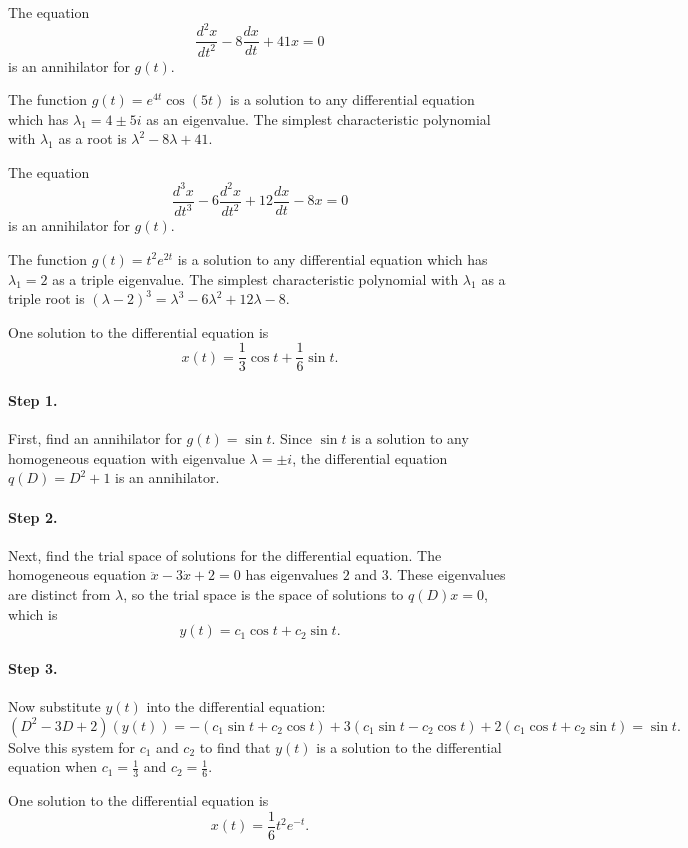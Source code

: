 \documentclass{ximera}
\begin{document}
 \ans The equation
\[
\frac{d^2x}{dt^2} - 8\frac{dx}{dt} + 41x = 0
\]
is an annihilator for $g(t)$.

\soln The function $g(t) = e^{4t}\cos(5t)$ is a solution to any differential
equation which has $\lambda_1 = 4 \pm 5i$ as an eigenvalue.  The
simplest characteristic polynomial with $\lambda_1$ as a root is
$\lambda^2 - 8\lambda + 41$.

 \ans The equation
\[
\frac{d^3x}{dt^3} - 6\frac{d^2x}{dt^2} + 12\frac{dx}{dt} - 8x = 0
\]
is an annihilator for $g(t)$.

\soln The function $g(t) = t^2e^{2t}$ is a solution to any differential
equation which has $\lambda_1 = 2$ as a triple eigenvalue.  The simplest
characteristic polynomial with $\lambda_1$ as a triple root is
$(\lambda - 2)^3 = \lambda^3 - 6\lambda^2 + 12\lambda - 8$.

 \ans One solution to the differential equation is
\[
x(t) = \frac{1}{3}\cos t + \frac{1}{6}\sin t.
\]

\soln
\paragraph{Step 1.} First, find an annihilator for $g(t) = \sin t$.  Since
$\sin t$ is a solution to any homogeneous equation with eigenvalue
$\lambda = \pm i$, the differential equation $q(D) = D^2 + 1$ is an
annihilator.

\paragraph{Step 2.} Next, find the trial space of solutions for the
differential equation.  The homogeneous equation $\ddot{x} - 3\dot{x}
+ 2 = 0$ has eigenvalues $2$ and $3$.  These eigenvalues are distinct
from $\lambda$, so the trial space is the space of solutions to $q(D)x
= 0$, which is
\[
y(t) = c_1\cos t + c_2\sin t.
\]
\paragraph{Step 3.} Now substitute $y(t)$ into the differential equation:
\[
(D^2 - 3D + 2)(y(t)) = -(c_1\sin t + c_2\cos t) + 3(c_1\sin t - c_2\cos t)
+ 2(c_1\cos t + c_2\sin t) = \sin t.
\]
Solve this system for $c_1$ and $c_2$ to find that $y(t)$ is a solution to
the differential equation when $c_1 = \frac{1}{3}$ and $c_2 = \frac{1}{6}$.

 \ans One solution to the differential equation is
\[
x(t) = \frac{1}{6}t^2e^{-t}.
\]
\end{document}
